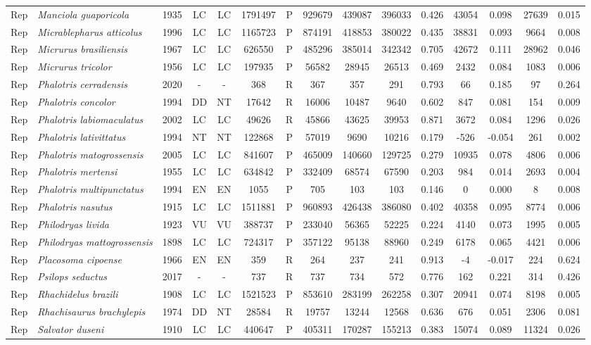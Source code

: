 \documentclass[12pt,openright,oneside,a4paper,english]{abntex2}
\begin{document}
\begin{landscape}
\begin{longtable}{llccccccccccccc}
		Rep&\textit{Manciola guaporicola}&1935&LC&LC&1791497&P&929679&439087&396033&0.426&43054&0.098&27639&0.015\\
		Rep&\textit{Micrablepharus atticolus}&1996&LC&LC&1165723&P&874191&418853&380022&0.435&38831&0.093&9664&0.008\\
		Rep&\textit{Micrurus brasiliensis}&1967&LC&LC&626550&P&485296&385014&342342&0.705&42672&0.111&28962&0.046\\
		Rep&\textit{Micrurus tricolor}&1956&LC&LC&197935&P&56582&28945&26513&0.469&2432&0.084&1083&0.006\\
		Rep&\textit{Phalotris cerradensis}&2020&-&-&368&R&367&357&291&0.793&66&0.185&97&0.264\\
		Rep&\textit{Phalotris concolor}&1994&DD&NT&17642&R&16006&10487&9640&0.602&847&0.081&154&0.009\\
		Rep&\textit{Phalotris labiomaculatus}&2002&LC&LC&49626&R&45866&43625&39953&0.871&3672&0.084&1296&0.026\\
		Rep&\textit{Phalotris lativittatus}&1994&NT&NT&122868&P&57019&9690&10216&0.179&-526&-0.054&261&0.002\\
		Rep&\textit{Phalotris matogrossensis}&2005&LC&LC&841607&P&465009&140660&129725&0.279&10935&0.078&4806&0.006\\
		Rep&\textit{Phalotris mertensi}&1955&LC&LC&634842&P&332409&68574&67590&0.203&984&0.014&2693&0.004\\
		Rep&\textit{Phalotris multipunctatus}&1994&EN&EN&1055&P&705&103&103&0.146&0&0.000&8&0.008\\
		Rep&\textit{Phalotris nasutus}&1915&LC&LC&1511881&P&960893&426438&386080&0.402&40358&0.095&8774&0.006\\
		Rep&\textit{Philodryas livida}&1923&VU&VU&388737&P&233040&56365&52225&0.224&4140&0.073&1995&0.005\\
		Rep&\textit{Philodryas mattogrossensis}&1898&LC&LC&724317&P&357122&95138&88960&0.249&6178&0.065&4421&0.006\\
		Rep&\textit{Placosoma cipoense}&1966&EN&EN&359&R&264&237&241&0.913&-4&-0.017&224&0.624\\
		Rep&\textit{Psilops seductus}&2017&-&-&737&R&737&734&572&0.776&162&0.221&314&0.426\\
		Rep&\textit{Rhachidelus brazili}&1908&LC&LC&1521523&P&853610&283199&262258&0.307&20941&0.074&8198&0.005\\
		Rep&\textit{Rhachisaurus brachylepis}&1974&DD&NT&28584&R&19757&13244&12568&0.636&676&0.051&2306&0.081\\
		Rep&\textit{Salvator duseni}&1910&LC&LC&440647&P&405311&170287&155213&0.383&15074&0.089&11324&0.026\\

\end{longtable}
\end{landscape}
\end{document}
